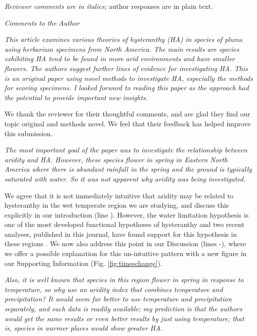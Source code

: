 \documentclass{article}[12pt]
\begin{document}


\emph{Reviewer comments are in italics;} author responses are in plain text.

\emph{Comments to the Author}

\emph{This article examines various theories of hysteranthy (HA) in species of plums using herbarium specimens from North America. The main results are species exhibiting HA tend to be found in more arid environments and have smaller flowers.  The authors suggest further lines of evidence for investigating HA. This is an original paper using novel methods to investigate HA, especially the methods for scoring specimens.  I looked forward to reading this paper as the approach had the potential to provide important new insights.}

We thank the reviewer for their thoughtful comments, and are glad they find our topic original and methods novel. We feel that their feedback has helped improve this submission.

\emph{The most important goal of the paper was to investigate the relationship between aridity and HA. However, these species flower in spring in Eastern North America where there is abundant rainfall in the spring and the ground is typically saturated with water. So it was not apparent why aridity was being investigated.}

We agree that it is not immediately intuitive that aridity may be related to hysteranthy in the wet temperate region we are studying, and discuss this explicitly in our introduction (line ). However, the water limitation hypothesis is one of the most developed functional hypotheses of hysteranthy and two recent analyses, published in this journal, have found support for this hypothesis in these regions \citep{Gougherty2018,Buonaiuto2020}. %
We now also address this point in our Discussion (lines -), where we offer a possible explanation for this un-intuitive pattern with a new figure in our Supporting Information (Fig. \ref{fig:timeschange}).

\emph{Also, it is well known that species in this region flower in spring in response to temperature, so why use an aridity index that combines temperature and precipitation?  It would seem far better to use temperature and precipitation separately, and such data is readily available; my prediction is that the authors would get the same results or even better results by just using temperature; that is, species in warmer places would show greater HA.}
\end{document}
